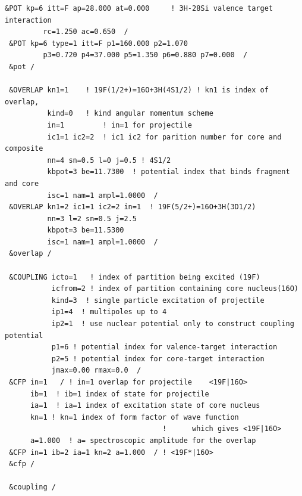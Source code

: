 \documentclass[11pt]{book}
\begin{document}
\begin{small}
\begin{lstlisting}[frame=single]
 &POT kp=6 itt=F ap=28.000 at=0.000     ! 3H-28Si valence target interaction 
         rc=1.250 ac=0.650  /            
 &POT kp=6 type=1 itt=F p1=160.000 p2=1.070
         p3=0.720 p4=37.000 p5=1.350 p6=0.880 p7=0.000  /
 &pot /
   
 &OVERLAP kn1=1    ! 19F(1/2+)=16O+3H(4S1/2) ! kn1 is index of overlap, 
          kind=0   ! kind angular momentum scheme  
          in=1         ! in=1 for projectile 
          ic1=1 ic2=2  ! ic1 ic2 for parition number for core and composite
          nn=4 sn=0.5 l=0 j=0.5 ! 4S1/2
          kbpot=3 be=11.7300  ! potential index that binds fragment and core
          isc=1 nam=1 ampl=1.0000  / 
 &OVERLAP kn1=2 ic1=1 ic2=2 in=1  ! 19F(5/2+)=16O+3H(3D1/2)
          nn=3 l=2 sn=0.5 j=2.5 
          kbpot=3 be=11.5300 
          isc=1 nam=1 ampl=1.0000  /          
 &overlap /

 &COUPLING icto=1   ! index of partition being excited (19F)
           icfrom=2 ! index of partition containing core nucleus(16O)
           kind=3  ! single particle excitation of projectile 
           ip1=4  ! multipoles up to 4
           ip2=1  ! use nuclear potential only to construct coupling potential 
           p1=6 ! potential index for valence-target interaction
           p2=5 ! potential index for core-target interaction 
           jmax=0.00 rmax=0.0  /
 &CFP in=1   / ! in=1 overlap for projectile    <19F|16O>
      ib=1  ! ib=1 index of state for projectile
      ia=1  ! ia=1 index of excitation state of core nucleus
      kn=1 ! kn=1 index of form factor of wave function
                                     !      which gives <19F|16O>
      a=1.000  ! a= spectroscopic amplitude for the overlap 
 &CFP in=1 ib=2 ia=1 kn=2 a=1.000  / ! <19F*|16O>
 &cfp /

 &coupling /

\end{lstlisting}
\end{small} 
\end{document}
